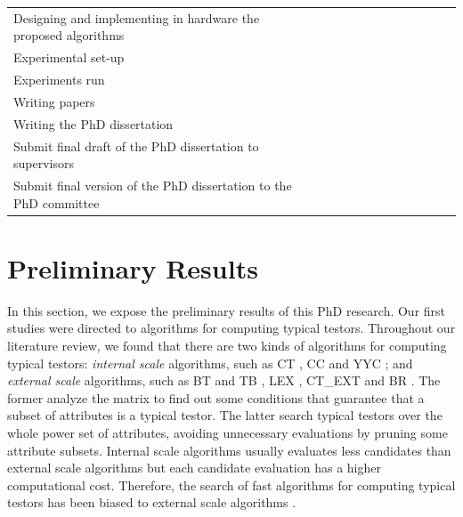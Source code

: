\documentclass[authoryear,11pt]{elsarticle}
\begin{document}
\begin{table}[h!]
\begin{tabular}{|p{7cm}|c|c|c|c|c|c|c|c|c|c|c|c|}
		&&&&&&&\cellcolor[gray]{0.9}&\cellcolor[gray]{0.9}&\cellcolor[gray]{0.9}&&&\\
		\hline
		Designing and implementing in hardware the proposed algorithms
		&&&&&&&&\cellcolor[gray]{0.9}&\cellcolor[gray]{0.9}&&&\\
		\hline
		Experimental set-up &\cellcolor{blue}&\cellcolor{blue}&&\cellcolor[gray]{0.9}&
		\cellcolor[gray]{0.9}&&\cellcolor[gray]{0.9}&\cellcolor[gray]{0.9}&&&&\\
		\hline
		Experiments run &&&\cellcolor{blue}&\cellcolor[gray]{0.9}&&\cellcolor[gray]{0.9}&\cellcolor[gray]{0.9}&&
		\cellcolor[gray]{0.9}&&&\\
		\hline
		Writing papers &\cellcolor{blue}&&\cellcolor{blue}&&\cellcolor[gray]{0.9}&&\cellcolor[gray]{0.9}&&
		\cellcolor[gray]{0.9}&&&\\
		\hline
		Writing the PhD dissertation &&&&\cellcolor[gray]{0.9}&\cellcolor[gray]{0.9}&\cellcolor[gray]{0.9}&
		\cellcolor[gray]{0.9}&\cellcolor[gray]{0.9}&\cellcolor[gray]{0.9}&&&\\
		\hline
		Submit final draft of the PhD dissertation to supervisors &&&&&&&&&&\cellcolor[gray]{0.9}&&\\
		\hline
		Submit final version of the PhD dissertation to the PhD committee &&&&&&&&&&&\cellcolor[gray]{0.9}&\\
		\hline
		
 	\end{tabular}             
 \end{table}
 
	  	

\section{Preliminary Results}
	In this section, we expose the preliminary results of this PhD research.
	Our first studies were directed to algorithms for computing typical testors. 
	Throughout our literature review, we found that there are two kinds of algorithms for computing 
	typical testors: \emph{internal scale} algorithms, such as CT \citep{Bravo83}, CC \citep{Aguila84} and
	YYC \citep{Alba14}; and \emph{external scale} algorithms, such as BT and TB \citep{Ruiz85}, LEX 
	\citep{Santiesteban03}, CT\_EXT \citep{Sanchez07} and BR \citep{Lias09}. 
	The former analyze the matrix to find out some conditions that guarantee that a subset of attributes 
	is a typical testor. The latter search typical testors over the whole power set of attributes, 
	avoiding unnecessary evaluations by pruning some attribute subsets. 
	Internal scale algorithms usually evaluates less candidates than external scale algorithms but each 
	candidate evaluation has a higher computational cost. Therefore, the search of fast algorithms for computing
	typical testors has been biased to external scale algorithms \citep{Alba14}.
	
\end{document}

